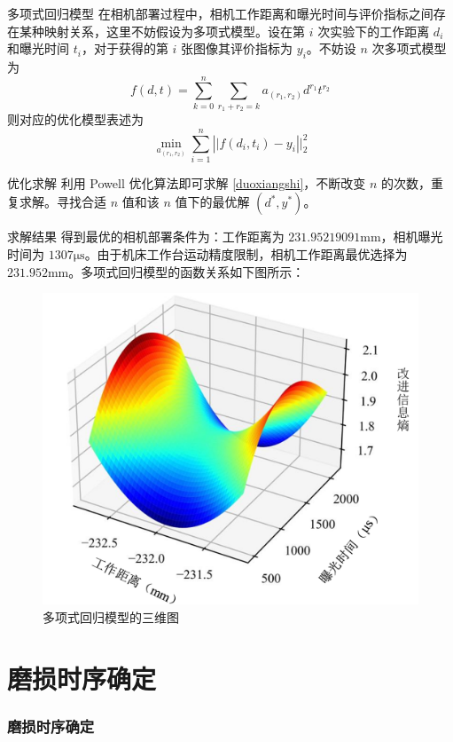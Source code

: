 \documentclass[aspectratio=169,t,xcolor=table,10pt]{ctexbeamer}
\numberwithin{equation}{section} %
\newcommand{\norm}[1]{\left||{#1}\right||}
\begin{document}
	\begin{frame}
		\begin{block}{多项式回归模型}
			\qquad 在相机部署过程中，相机工作距离和曝光时间与评价指标之间存在某种映射关系，这里不妨假设为多项式模型。设在第 $i$ 次实验下的工作距离 $d_i$ 和曝光时间 $t_i$，对于获得的第 $i$ 张图像其评价指标为 $y_i$。不妨设 $n$ 次多项式模型为
			\begin{equation}
				f(d,t)=\sum_{k=0}^{n}\sum_{r_1+r_2=k}a_{(r_1,r_2)}d^{r_1}t^{r_2}
			\end{equation}
			则对应的优化模型表述为
			\begin{equation}
				\min_{a_{(r_1,r_2)}}\sum_{i=1}^{n}\norm{f(d_i,t_i)-y_i}_2^2
				\label{duoxiangshi}
			\end{equation}
		\end{block}
		\begin{block}{优化求解}
			\qquad 利用 Powell 优化算法即可求解 \eqref{duoxiangshi}，不断改变 $n$ 的次数，重复求解。寻找合适 $n$ 值和该 $n$ 值下的最优解 $(d^*,y^*)$。
		\end{block}
	\end{frame}

	\begin{frame}
		\begin{block}{求解结果}
			\qquad 得到最优的相机部署条件为：工作距离为 $231.95219091\mathrm{mm}$，相机曝光时间为 $1307\mathrm{\mu s}$。由于机床工作台运动精度限制，相机工作距离最优选择为 $231.952\mathrm{mm}$。多项式回归模型的函数关系如下图所示：
			\begin{figure}[H]
				\centering
				\includegraphics[width=0.5\linewidth]{Figure/Res1}
				\caption{多项式回归模型的三维图}
			\end{figure}
		\end{block}
	\end{frame}


	\section{磨损时序确定}
	\begin{frame}
		\frametitle{磨损时序确定}
	\end{frame}
	
\end{document}
